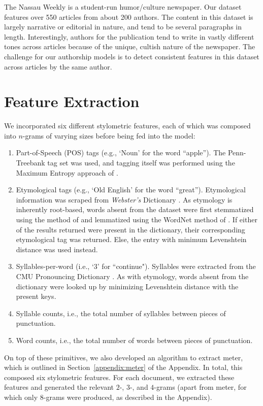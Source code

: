 \documentclass[14pt]{article} %
\theoremstyle{plain}
\theoremstyle{definition}
\theoremstyle{remark}
\begin{document}
The Nassau Weekly is a student-run humor/culture newspaper. Our dataset features over 550 articles from about 200 authors. The content in this dataset is largely narrative or editorial in nature, and tend to be several paragraphs in length. Interestingly, authors for the publication tend to write in vastly different tones across articles because of the unique, cultish nature of the newspaper. The challenge for our authorship models is to detect consistent features in this dataset across articles by the same author.

\section{Feature Extraction}

We incorporated six different stylometric features, each of which was composed into $n$-grams of varying sizes before being fed into the model:
\begin{enumerate}
\item Part-of-Speech (POS) tags (e.g., `Noun' for the word ``apple''). The Penn-Treebank tag set was used, and tagging itself was performed using the Maximum Entropy approach of \citet{Ratnaparkhi}.
\item Etymological tags (e.g., `Old English' for the word ``great''). Etymological information was scraped from \textit{Webster's} Dictionary \citep{Dictionary}. As etymology is inherently root-based, words absent from the dataset were first stemmatized using the method of \citet{Porter} and lemmatized using the WordNet method of \citet{Fellbaum}. If either of the results returned were present in the dictionary, their corresponding etymological tag was returned. Else, the entry with minimum Levenshtein distance \citep{Levenshtein} was used instead.
\item Syllables-per-word (i.e., `3' for ``continue"). Syllables were extracted from the CMU Pronouncing Dictionary \citep{Lenzo}. As with etymology, words absent from the dictionary were looked up by minimizing Levenshtein distance with the present keys.
\item Syllable counts, i.e., the total number of syllables between pieces of punctuation.
\item Word counts, i.e., the total number of words between pieces of punctuation.
\end{enumerate}On top of these primitives, we also developed an algorithm to extract meter, which is outlined in Section~\ref{appendix:meter} of the Appendix. In total, this composed six stylometric features. For each document, we extracted these features and generated the relevant $2$-, $3$-, and $4$-grams (apart from meter, for which only $8$-grams were produced, as described in the Appendix).
\end{document}
